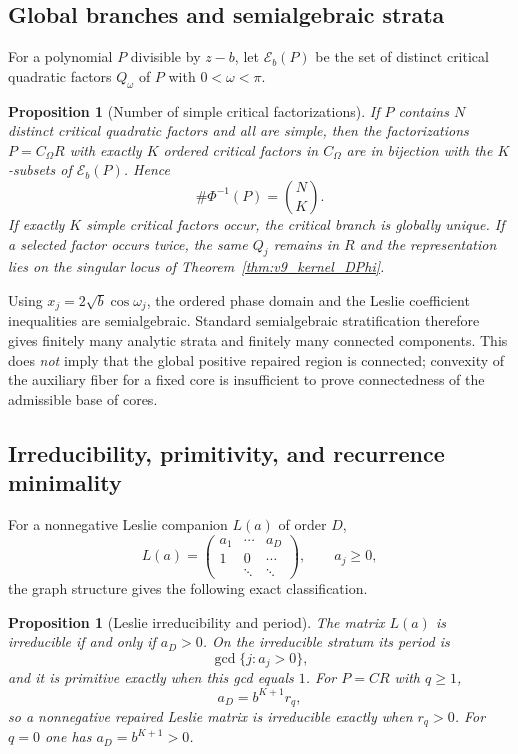 \documentclass[11pt]{amsart}
\numberwithin{equation}{section}
\theoremstyle{plain}
\newtheorem{proposition}[theorem]{Proposition}
\theoremstyle{definition}
\theoremstyle{remark}
\begin{document}
\subsection{Global branches and semialgebraic strata}

For a polynomial $P$ divisible by $z-b$, let $\mathcal E_b(P)$ be the set of distinct critical
quadratic factors $Q_\omega$ of $P$ with $0<\omega<\pi$.

\begin{proposition}[Number of simple critical factorizations]
\label{prop:v9_global_branch_count}
If $P$ contains $N$ distinct critical quadratic factors and all are simple, then the
factorizations $P=C_\Omega R$ with exactly $K$ ordered critical factors in $C_\Omega$ are in
bijection with the $K$-subsets of $\mathcal E_b(P)$.  Hence
\[
\#\Phi^{-1}(P)=\binom NK.
\]
If exactly $K$ simple critical factors occur, the critical branch is globally unique.  If a
selected factor occurs twice, the same $Q_j$ remains in $R$ and the representation lies on the
singular locus of Theorem~\ref{thm:v9_kernel_DPhi}.
\end{proposition}

Using $x_j=2\sqrt b\cos\omega_j$, the ordered phase domain and the Leslie coefficient inequalities
are semialgebraic.  Standard semialgebraic stratification therefore gives finitely many analytic
strata and finitely many connected components.  This does \emph{not} imply that the global
positive repaired region is connected; convexity of the auxiliary fiber for a fixed core is
insufficient to prove connectedness of the admissible base of cores.

\subsection{Irreducibility, primitivity, and recurrence minimality}

For a nonnegative Leslie companion $L(a)$ of order $D$,
\[
L(a)=
\begin{pmatrix}
a_1&\cdots&a_D\\
1&0&\cdots\\
&\ddots&\ddots
\end{pmatrix},
\qquad a_j\ge0,
\]
the graph structure gives the following exact classification.

\begin{proposition}[Leslie irreducibility and period]
\label{prop:v9_leslie_irreducibility}
The matrix $L(a)$ is irreducible if and only if $a_D>0$.  On the irreducible stratum its period is
\[
\gcd\{j:a_j>0\},
\]
and it is primitive exactly when this gcd equals $1$.  For $P=CR$ with $q\ge1$,
\begin{equation}
\boxed{a_D=b^{K+1}r_q,}
\label{eq:v9_last_coeff_rq}
\end{equation}
so a nonnegative repaired Leslie matrix is irreducible exactly when $r_q>0$.  For $q=0$ one has
$a_D=b^{K+1}>0$.
\end{proposition}
\end{document}
